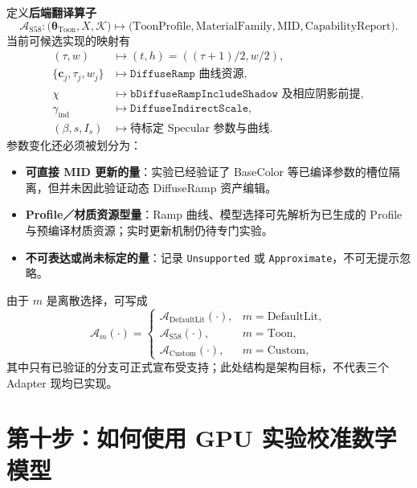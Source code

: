 \documentclass[UTF8,11pt,a4paper]{ctexart}
\numberwithin{equation}{section}
\begin{document}
定义\textbf{后端翻译算子}
\begin{equation}
\boxed{\mathcal A_{\mathrm{S58}}:
\bigl(\boldsymbol\theta_{\mathrm{Toon}},X,\mathcal K\bigr)
\longmapsto
\bigl(\mathrm{ToonProfile},\mathrm{MaterialFamily},\mathrm{MID},\mathrm{CapabilityReport}\bigr).}
\label{eq:adapter}
\end{equation}
当前可候选实现的映射有
\begin{align}
(\tau,w)&\longmapsto(t,h)=((\tau+1)/2,w/2),\\
\{\mathbf c_j,\tau_j,w_j\}&\longmapsto\texttt{DiffuseRamp 曲线资源},\\
\chi&\longmapsto\texttt{bDiffuseRampIncludeShadow} \text{ 及相应阴影前提},\\
\gamma_{\mathrm{ind}}&\longmapsto\texttt{DiffuseIndirectScale},\\
(\beta,s,I_s)&\longmapsto\text{待标定 Specular 参数与曲线}.
\end{align}
参数变化还必须被划分为：
\begin{itemize}
\item \textbf{可直接 MID 更新的量}：实验已经验证了 BaseColor 等已编译参数的槽位隔离，但并未因此验证动态 DiffuseRamp 资产编辑。
\item \textbf{Profile／材质资源型量}：Ramp 曲线、模型选择可先解析为已生成的 Profile 与预编译材质资源；实时更新机制仍待专门实验。
\item \textbf{不可表达或尚未标定的量}：记录 \texttt{Unsupported} 或 \texttt{Approximate}，不可无提示忽略。
\end{itemize}
由于 $m$ 是离散选择，可写成
\begin{equation}
\mathcal A_{m}(\cdot)=
\begin{cases}
\mathcal A_{\mathrm{DefaultLit}}(\cdot),&m=\mathrm{DefaultLit},\\
\mathcal A_{\mathrm{S58}}(\cdot),&m=\mathrm{Toon},\\
\mathcal A_{\mathrm{Custom}}(\cdot),&m=\mathrm{Custom},
\end{cases}
\end{equation}
其中只有已验证的分支可正式宣布受支持；此处结构是架构目标，不代表三个 Adapter 现均已实现。

\section{第十步：如何使用 GPU 实验校准数学模型}
\end{document}
